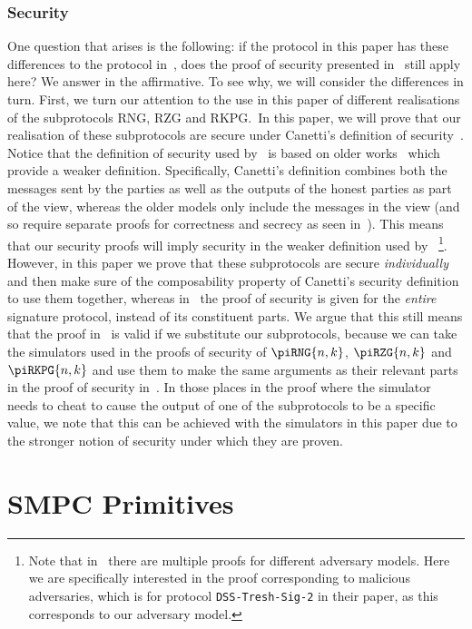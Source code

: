 \documentclass{article}
\newcommand\paper{paper}
\theoremstyle{remark}
\begin{document}
\subsubsection{Security}

One question that arises is the following: if the protocol in this \paper{} has
these differences to the protocol in~\cite{gjkr96}, does the proof of security
presented in~\cite{gjkr96} still apply here? We answer in the affirmative. To
see why, we will consider the differences in turn. First, we turn our attention
to the use in this \paper{} of different realisations of the subprotocols RNG,
RZG and RKPG.\ In this paper, we will prove that our realisation of these
subprotocols are secure under Canetti's definition of security~\cite{c00}.
Notice that the definition of security used by~\cite{gjkr96} is based on older
works~\cite{gmr89,mr92,b92} which provide a weaker definition. Specifically,
Canetti's definition combines both the messages sent by the parties as well as
the outputs of the honest parties as part of the view, whereas the older models
only include the messages in the view (and so require separate proofs for
correctness and secrecy as seen in~\cite{gjkr96}). This means that our security
proofs will imply security in the weaker definition used by~\cite{gjkr96}%
\footnote{%
	Note that in~\cite{gjkr96} there are multiple proofs for different
	adversary models. Here we are specifically interested in the proof
	corresponding to malicious adversaries, which is for protocol
	\texttt{DSS-Tresh-Sig-2} in their paper, as this corresponds to our
	adversary model.
}.
However, in this \paper{} we prove that these subprotocols are secure
\textit{individually} and then make sure of the composability property of
Canetti's security definition to use them together, whereas in~\cite{gjkr96}
the proof of security is given for the \textit{entire} signature protocol,
instead of its constituent parts. We argue that this still means that the proof
in~\cite{gjkr96} is valid if we substitute our subprotocols, because we can
take the simulators used in the proofs of security of $\piRNG{n,k}$,
$\piRZG{n,k}$ and $\piRKPG{n,k}$ and use them to make the same arguments as
their relevant parts in the proof of security in~\cite{gjkr96}. In those places
in the proof where the simulator needs to cheat to cause the output of one of
the subprotocols to be a specific value, we note that this can be achieved with
the simulators in this paper due to the stronger notion of security under which
they are proven.

\section{SMPC Primitives}
\end{document}
